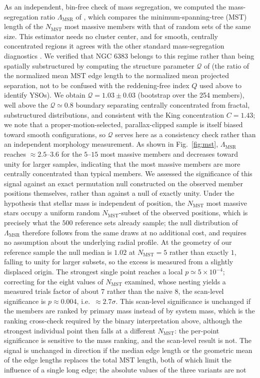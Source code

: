 \documentclass{aa}
\begin{document}
As an independent, bin-free check of mass segregation, we computed the mass-segregation ratio $\Lambda_{\mathrm{MSR}}$ of \citet{2009MNRAS.395.1449A}, which compares the minimum-spanning-tree (MST) length of the $N_{\mathrm{MST}}$ most massive members with that of random sets of the same size. This estimator needs no cluster center, and for smooth, centrally concentrated regions it agrees with the other standard mass-segregation diagnostics \citep{2015MNRAS.449.3381P}. We verified that NGC 6383 belongs to this regime rather than being spatially substructured by computing the structure parameter $\mathcal{Q}$ of \citet{2004MNRAS.348..589C} (the ratio of the normalized mean MST edge length to the normalized mean projected separation, not to be confused with the reddening-free index $Q$ used above to identify YSOs). We obtain $\mathcal{Q}=1.03\pm0.03$ (bootstrap over the 254 members), well above the $\mathcal{Q}\simeq0.8$ boundary separating centrally concentrated from fractal, substructured distributions, and consistent with the King concentration $C=1.43$; we note that a proper-motion-selected, parallax-clipped sample is itself biased toward smooth configurations, so $\mathcal{Q}$ serves here as a consistency check rather than an independent morphology measurement. As shown in Fig.~\ref{fig:mst}, $\Lambda_{\mathrm{MSR}}$ reaches $\approx2.5$--$3.6$ for the $5$--$15$ most massive members and decreases toward unity for larger samples, indicating that the most massive members are more centrally concentrated than typical members. We assessed the significance of this signal against an exact permutation null constructed on the observed member positions themselves, rather than against a null of exactly unity. Under the hypothesis that stellar mass is independent of position, the $N_{\mathrm{MST}}$ most massive stars occupy a uniform random $N_{\mathrm{MST}}$-subset of the observed positions, which is precisely what the $500$ reference sets already sample; the null distribution of $\Lambda_{\mathrm{MSR}}$ therefore follows from the same draws at no additional cost, and requires no assumption about the underlying radial profile. At the geometry of our reference sample the null median is $1.02$ at $N_{\mathrm{MST}}=5$ rather than exactly $1$, falling to unity for larger subsets, so the excess is measured from a slightly displaced origin. The strongest single point reaches a local $p\simeq5\times10^{-4}$; correcting for the eight values of $N_{\mathrm{MST}}$ examined, whose nesting yields a measured trials factor of about $7$ rather than the naive $8$, the scan-level significance is $p\approx0.004$, i.e.\ $\approx2.7\sigma$. This scan-level significance is unchanged if the members are ranked by primary mass instead of by system mass, which is the ranking cross-check required by the binary interpretation above, although the strongest individual point then falls at a different $N_{\mathrm{MST}}$: the per-point significance is sensitive to the mass ranking, and the scan-level result is not. The signal is unchanged in direction if the median edge length \citep{2011MNRAS.416..541M} or the geometric mean of the edge lengths \citep{2011A&A...532A.119O} replaces the total MST length, both of which limit the influence of a single long edge; the absolute values of the three variants are not 
\end{document}
